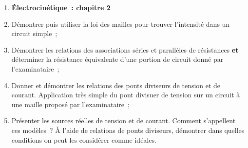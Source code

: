 \documentclass[a4paper, 12pt, final, garamond]{book}
\begin{document}
\begin{enumerate}
	\item[] \textbf{Électrocinétique~: chapitre 2}
	\item Démontrer puis utiliser la loi des mailles pour trouver l'intensité
	      dans un circuit simple~;
	\item Démontrer les relations des associations séries et parallèles de
	      résistances \textbf{et} déterminer la résistance équivalente d'une
	      portion de circuit donné par l'examinataire~;
	\item Donner et démontrer les relations des ponts diviseurs de tension et de
	      courant. Application très simple du pont divisuer de tension sur un
	      circuit à une maille proposé par l'examinataire~;
	\item Présenter les sources réelles de tension et de courant. Comment
	      s'appellent ces modèles~? À l'aide de relations de ponts diviseurs,
	      démontrer dans quelles conditions on peut les considérer comme idéales.
\end{enumerate}
\end{document}
